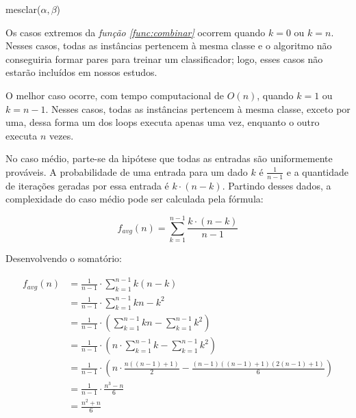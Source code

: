 \begin{function}[h!]


    \caption{mesclar($\alpha, \beta$)}
    \label{func:mesclar}
\end{function}

Os casos extremos da \emph{função \ref{func:combinar}} ocorrem quando $k = 0$ ou $k = n$. Nesses casos, todas as instâncias pertencem à mesma classe e o algoritmo não conseguiria formar pares para treinar um classificador; logo, esses casos não estarão incluídos em nossos estudos.

O melhor caso ocorre, com tempo computacional de $O(n)$, quando $k = 1$ ou $k = n - 1$. Nesses casos, todas as instâncias pertencem à mesma classe, exceto por uma, dessa forma um dos loops executa apenas uma vez, enquanto o outro executa $n$ vezes.

No caso médio, parte-se da hipótese que todas as entradas são uniformemente prováveis. A probabilidade de uma entrada para um dado $k$ é $\frac{1}{n - 1}$ e a quantidade de iterações geradas por essa entrada é $k \cdot (n - k)$. Partindo desses dados, a complexidade do caso médio pode ser calculada pela fórmula:

\[f_{avg}(n) = \sum_{k = 1}^{n - 1} \frac{k \cdot (n - k)}{n - 1}\]

Desenvolvendo o somatório:

\begin{align*}
    f_{avg}(n) &= \frac{1}{n - 1} \cdot \sum_{k = 1}^{n - 1} k(n - k) \\
               &= \frac{1}{n - 1} \cdot \sum_{k = 1}^{n - 1} kn - k^2 \\
               &= \frac{1}{n - 1} \cdot \left(\sum_{k = 1}^{n - 1} kn - \sum_{k = 1}^{n - 1} k^2\right) \\
               &= \frac{1}{n - 1} \cdot \left(n \cdot \sum_{k = 1}^{n - 1} k - \sum_{k = 1}^{n - 1} k^2\right) \\
               &= \frac{1}{n - 1} \cdot \left(n \cdot \frac{n((n - 1) + 1)}{2} - \frac{(n - 1)((n - 1) + 1)(2(n - 1) + 1)}{6}\right) \\
               &= \frac{1}{n - 1} \cdot \frac{n^3 - n}{6} \\
               &= \frac{n^2 + n}{6}
\end{align*}

